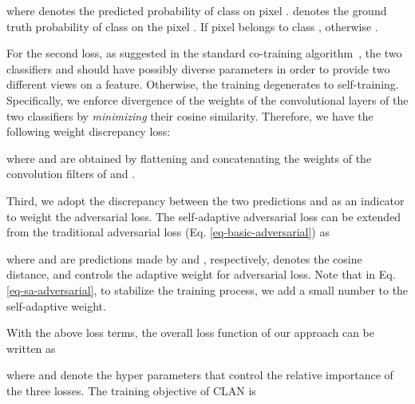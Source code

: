 \documentclass[10pt,twocolumn,letterpaper]{article}
\begin{document}
where  denotes the predicted probability of class  on pixel .  denotes the ground truth probability of class  on the pixel . If pixel  belongs to class ,  otherwise .

For the second loss, as suggested in the standard co-training algorithm~\cite{zhou2005cotrain}, the two classifiers  and  should have possibly diverse parameters in order to provide two different views on a feature. Otherwise, the training degenerates to self-training. Specifically, we enforce divergence of the weights of the convolutional layers of the two classifiers by \emph{minimizing} their cosine similarity. Therefore, we have the following weight discrepancy loss:

where  and  are obtained by flattening and concatenating the weights of the convolution filters of  and .

Third, we adopt the discrepancy between the two predictions  and  as an indicator to weight the adversarial loss. 
The self-adaptive adversarial loss can be extended from the traditional adversarial loss (Eq. \ref{eq-basic-adversarial}) as

where  and  are predictions made by  and , respectively,  denotes the cosine distance, and  controls the adaptive weight for adversarial loss.
Note that in Eq. \ref{eq-sa-adversarial}, to stabilize the training process, we add a small number  to the self-adaptive weight.

With the above loss terms, the overall loss function of our approach can be written as

where  and  denote the hyper parameters that control the relative importance of the three losses. The training objective of CLAN is
\end{document}
